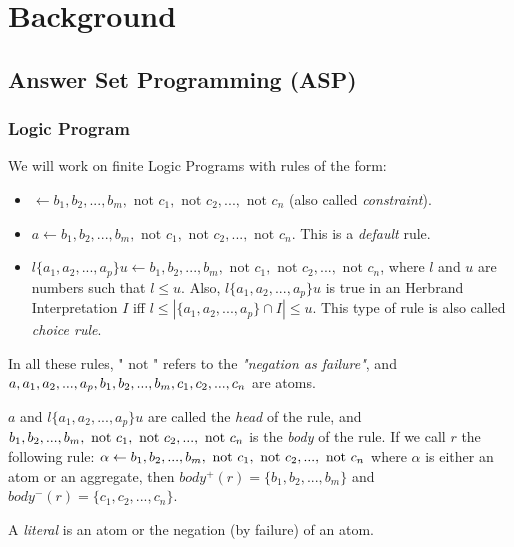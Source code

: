 \chapter{Background}


\section{Answer Set Programming (ASP)}

\subsection{Logic Program}

We will work on finite Logic Programs with rules of the form:
\begin{itemize}
\item $\leftarrow b_1, b_2, ..., b_m, \text{ not } c_1, \text{ not } c_2,...,\text{ not } c_n$ (also called \textit{constraint}).
\item $a \leftarrow b_1, b_2, ..., b_m, \text{ not } c_1, \text{ not } c_2,...,\text{ not } c_n$. This is a \textit{default} rule.
\item $l\{a_1, a_2, ..., a_p\}u \leftarrow b_1, b_2, ..., b_m, \text{ not } c_1, \text{ not } c_2,...,\text{ not } c_n$, where $l$ and $u$ are numbers such that $l \leq u$. Also, $l\{a_1, a_2, ..., a_p\}u$ is true in an Herbrand Interpretation $I$ iff $ l \leq |\{a_1, a_2, ..., a_p\}\cap I | \leq u$. This type of rule is also called \textit{choice rule}.
\end{itemize}
In all these rules, "$\text{ not }$" refers to the \textit{"negation as failure"}, and $a, a_1, a_2, ..., a_p, b_1, b_2,\\ ..., b_m, c_1, c_2, ...,  c_n$ are atoms. 

\smallskip

$a$ and $l\{a_1, a_2, ..., a_p\}u$ are called the \textit{head} of the rule, and $b_1, b_2, ..., b_m, \text{ not } c_1, \text{ not } c_2,\\..., \text{ not } c_n$ is the \textit{body} of the rule. If we call $r$ the following rule: $\alpha \leftarrow b_1, b_2, ..., b_m,\\ \text{ not } c_1, \text{ not } c_2,...,\text{ not } c_n$ where $\alpha$ is either an atom or an aggregate, then $body^+(r)=\{b_1, b_2,...,b_m \}$ and $body^-(r)=\{c_1, c_2,...,c_n \}$.

\smallskip

A \textit{literal} is an atom or the negation (by failure) of an atom.

